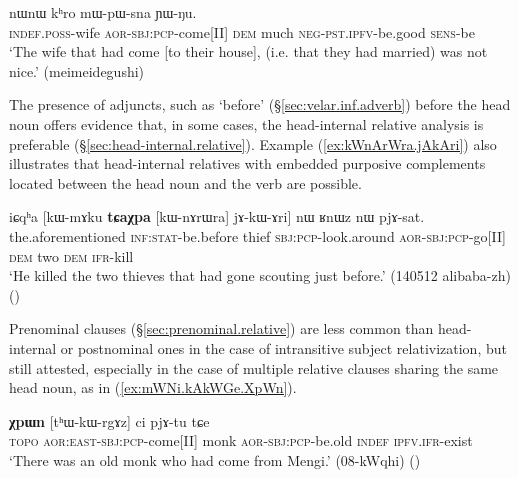 \begin{exe}
\ex \label{ex:tArZaB.jAkWGe}
 nɯnɯ kʰro mɯ-pɯ-sna ɲɯ-ŋu.  \\
\textsc{indef}.\textsc{poss}-wife \textsc{aor}-\textsc{sbj}:\textsc{pcp}-come[II] \textsc{dem} much \textsc{neg}-\textsc{pst}.\textsc{ipfv}-be.good \textsc{sens}-be \\
\glt `The wife that had come [to their house], (i.e. that they had married) was not nice.' (meimeidegushi)
\end{exe} 

The presence of adjuncts, such as  `before' (§\ref{sec:velar.inf.adverb}) before the head noun offers evidence that, in some cases, the head-internal relative analysis is preferable (§\ref{sec:head-internal.relative}). Example (\ref{ex:kWnArWra.jAkAri}) also illustrates that head-internal relatives with embedded purposive complements located between the head noun and the verb are possible.

\begin{exe}
\ex \label{ex:kWnArWra.jAkAri}
\gll iɕqʰa [kɯ-mɤku \textbf{tɕaχpa} [kɯ-nɤrɯra] jɤ-kɯ-ɤri] nɯ ʁnɯz nɯ pjɤ-sat. \\
the.aforementioned \textsc{inf}:\textsc{stat}-be.before thief \textsc{sbj}:\textsc{pcp}-look.around \textsc{aor}-\textsc{sbj}:\textsc{pcp}-go[II]  \textsc{dem} two \textsc{dem} \textsc{ifr}-kill \\
\glt `He killed the two thieves that had gone scouting just before.' (140512 alibaba-zh)
()
\end{exe} 

Prenominal clauses (§\ref{sec:prenominal.relative}) are less common than head-internal or postnominal ones in the case of intransitive subject relativization, but still attested, especially in the case of multiple relative clauses sharing the same head noun, as in (\ref{ex:mWNi.kAkWGe.XpWn}).
 
\begin{exe}
\ex \label{ex:mWNi.kAkWGe.XpWn}
\gll 	 [mɯŋi kɤ-kɯ-ɣe] \textbf{χpɯn} [tʰɯ-kɯ-rgɤz] ci pjɤ-tu tɕe \\
\textsc{topo} \textsc{aor}:\textsc{east}-\textsc{sbj}:\textsc{pcp}-come[II] monk \textsc{aor}-\textsc{sbj}:\textsc{pcp}-be.old \textsc{indef} \textsc{ipfv}.\textsc{ifr}-exist \\
\glt `There was an old monk who had come from Mengi.' (08-kWqhi)
()
\end{exe} 


